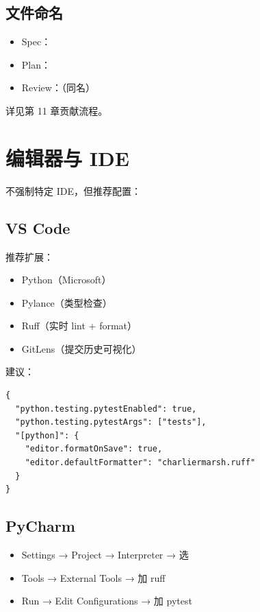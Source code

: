 \subsection{文件命名}

\begin{itemize}
  \item Spec：
  \item Plan：
  \item Review：（同名）
\end{itemize}

详见第 11 章贡献流程。

\section{编辑器与 IDE}

\openbench{} 不强制特定 IDE，但推荐配置：

\subsection{VS Code}

推荐扩展：

\begin{itemize}
  \item Python（Microsoft）
  \item Pylance（类型检查）
  \item Ruff（实时 lint + format）
  \item GitLens（提交历史可视化）
\end{itemize}

 建议：

\begin{verbatim}
{
  "python.testing.pytestEnabled": true,
  "python.testing.pytestArgs": ["tests"],
  "[python]": {
    "editor.formatOnSave": true,
    "editor.defaultFormatter": "charliermarsh.ruff"
  }
}
\end{verbatim}

\subsection{PyCharm}

\begin{itemize}
  \item Settings → Project → Interpreter → 选 
  \item Tools → External Tools → 加 ruff
  \item Run → Edit Configurations → 加 pytest
\end{itemize}

